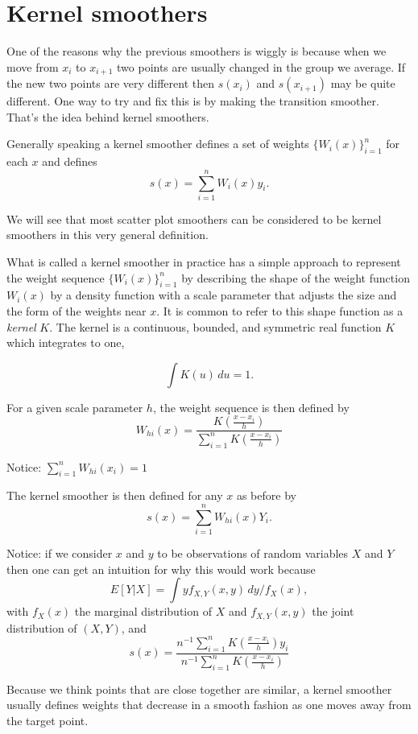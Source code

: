 \section{Kernel smoothers}
One of the reasons why the previous smoothers is wiggly is because
when we move from $x_i$ to $x_{i+1}$ two points are usually changed in
the group we average. If the new two points
are very different then  $s(x_i)$ and $s(x_{i+1})$ may be quite
different. One way to try and fix this is by making the transition
smoother. That's the idea behind kernel smoothers.

Generally speaking a kernel smoother defines a set of weights
$\{W_i(x)\}_{i=1}^{n}$ for each $x$ and defines 
\[
s(x) = \sum_{i=1}^n W_i(x) y_i.
\]

We will see that most scatter plot smoothers can be considered to be
kernel smoothers in this very general definition. 

What is called a kernel smoother in practice has a simple approach to
represent the weight sequence $\{W_i(x)\}_{i=1}^{n}$ by describing the
shape of the weight function $W_i(x)$ by a density function with a
scale parameter that adjusts the size and the form of the weights near
$x$. It is common to refer to this shape function as a {\it kernel}
$K$. The kernel is a continuous, bounded, and symmetric real function
$K$ which integrates to one,

\[
\int K(u)\,du = 1.
\]

For a given scale parameter $h$, the weight sequence is then defined
by
\[
W_{hi}(x) = \frac{K\left( \frac{x - x_i}{h} \right) }{ \sum_{i=1}^n K\left
  ( \frac{ x - x_i }{h} \right)}
\]

Notice: $\sum_{i=1}^n W_{hi} (x_i) = 1$


The kernel smoother is then defined for any $x$ as before by
\[
s(x) = \sum_{i=1}^n W_{hi}(x) Y_i.
\]

Notice: if we consider $x$ and $y$ to be observations of random
variables $X$ and $Y$ then one can get an intuition for why this would
work because
\[
E[ Y | X ] = \int y f_{X,Y}(x,y) \, dy / f_X(x),
\]
with $f_X(x)$ the marginal distribution of $X$ and $f_{X,Y}(x,y)$ the joint
distribution of $(X,Y)$, and 
\[
s(x) = \frac{ n^{-1}\sum_{i=1}^n K\left( \frac{x - x_i}{h} \right) y_i }
  { n^{-1}\sum_{i=1}^n K\left   ( \frac{ x - x_i }{h} \right)}
\]

Because we think points that are close together are similar, a kernel
smoother usually defines weights that decrease in  
a smooth fashion as one moves away from the target point. 

